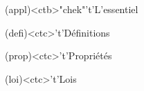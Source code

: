 \documentclass[../../main/main.tex]{subfiles}
\begin{document}
\begin{tcn}[%
		sidebyside, fontupper=\small, fontlower=\small
	](appl)<ctb>"chek"'t'{L'essentiel}
	\begin{tcn}[nsp](defi)<ctc>'t'{Définitions}
	\end{tcn}
	\begin{tcn}[nsp](prop)<ctc>'t'{Propriétés}
	\end{tcn}
	\begin{tcn}[nsp](loi)<ctc>'t'{Lois}

\end{tcn}
\end{tcn}
\end{document}
